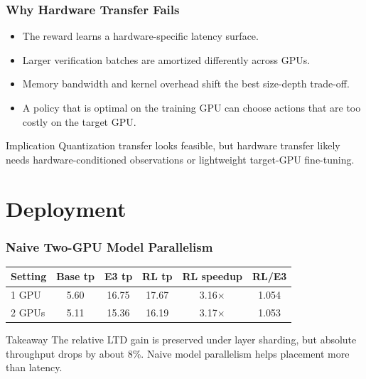 \documentclass[10pt]{beamer}
\newcommand{\speedup}[1]{#1$\times$}
\begin{document}
\begin{frame}
  \frametitle{Why Hardware Transfer Fails}
  \begin{itemize}
    \item The reward learns a hardware-specific latency surface.
    \item Larger verification batches are amortized differently across GPUs.
    \item Memory bandwidth and kernel overhead shift the best size-depth trade-off.
    \item A policy that is optimal on the training GPU can choose actions that are too costly on the target GPU.
  \end{itemize}

  \vspace{0.3cm}
  \begin{block}{Implication}
    Quantization transfer looks feasible, but hardware transfer likely needs hardware-conditioned observations or lightweight target-GPU fine-tuning.
  \end{block}
\end{frame}

\section{Deployment}

\begin{frame}
  \frametitle{Naive Two-GPU Model Parallelism}
  \begin{table}
    \centering
    \small
    \setlength{\tabcolsep}{5pt}
    \begin{tabular}{lccccc}
      \toprule
      Setting & Base tp & E3 tp & RL tp & RL speedup & RL/E3 \\
      \midrule
      1 GPU & 5.60 & 16.75 & 17.67 & \speedup{3.16} & 1.054 \\
      2 GPUs & 5.11 & 15.36 & 16.19 & \speedup{3.17} & 1.053 \\
      \bottomrule
    \end{tabular}
  \end{table}

  \begin{block}{Takeaway}
    The relative LTD gain is preserved under layer sharding, but absolute throughput drops by about 8\%. Naive model parallelism helps placement more than latency.
  \end{block}
\end{frame}
\end{document}
